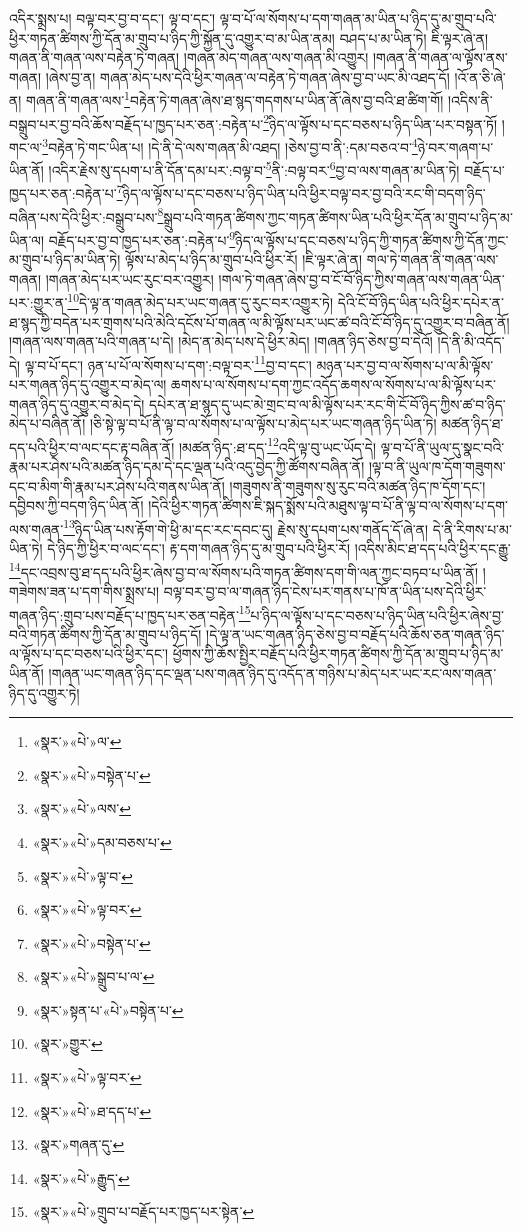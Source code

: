 འདིར་སྨྲས་པ། བལྟ་བར་བྱ་བ་དང་། ལྟ་བ་དང་། ལྟ་བ་པོ་ལ་སོགས་པ་དག་གཞན་མ་ཡིན་པ་ཉིད་དུ་མ་གྲུབ་པའི་ཕྱིར་གཏན་ཚིགས་ཀྱི་དོན་མ་གྲུབ་པ་ཉིད་ཀྱི་སྐྱོན་དུ་འགྱུར་བ་མ་ཡིན་ནམ། བཤད་པ་མ་ཡིན་ཏེ། ཇི་ལྟར་ཞེ་ན། གཞན་ནི་གཞན་ལས་བརྟེན་ཏེ་གཞན། །གཞན་མེད་གཞན་ལས་གཞན་མི་འགྱུར། །གཞན་ནི་གཞན་ལ་ལྟོས་ནས་གཞན། །ཞེས་བྱ་ན། གཞན་མེད་པས་དེའི་ཕྱིར་གཞན་ལ་བརྟེན་ཏེ་གཞན་ཞེས་བྱ་བ་ཡང་མི་འཐད་དོ། །འོ་ན་ཅི་ཞེ་ན། གཞན་ནི་གཞན་ལས་\footnote{«སྣར་»«པེ་»ལ་}བརྟེན་ཏེ་གཞན་ཞེས་ཐ་སྙད་གདགས་པ་ཡིན་ནོ་ཞེས་བྱ་བའི་ཐ་ཚིག་གོ། །འདིས་ནི་བསྒྲུབ་པར་བྱ་བའི་ཆོས་བརྗོད་པ་ཁྱད་པར་ཅན་:བརྟེན་པ་\footnote{«སྣར་»«པེ་»བསྟེན་པ་}ཉིད་ལ་ལྟོས་པ་དང་བཅས་པ་ཉིད་ཡིན་པར་བསྟན་ཏོ། །གང་ལ་\footnote{«སྣར་»«པེ་»ལས་}བརྟེན་ཏེ་གང་ཡིན་པ། །དེ་ནི་དེ་ལས་གཞན་མི་འཐད། །ཅེས་བྱ་བ་ནི་:དམ་བཅའ་བ་\footnote{«སྣར་»«པེ་»དམ་བཅས་པ་}ཉེ་བར་གཞག་པ་ཡིན་ནོ། །འདིར་རྗེས་སུ་དཔག་པ་ནི་དོན་དམ་པར་:བལྟ་བ་\footnote{«སྣར་»«པེ་»ལྟ་བ་}ནི་:བལྟ་བར་\footnote{«སྣར་»«པེ་»ལྟ་བར་}བྱ་བ་ལས་གཞན་མ་ཡིན་ཏེ། བརྗོད་པ་ཁྱད་པར་ཅན་:བརྟེན་པ་\footnote{«སྣར་»«པེ་»བསྟེན་པ་}ཉིད་ལ་ལྟོས་པ་དང་བཅས་པ་ཉིད་ཡིན་པའི་ཕྱིར་བལྟ་བར་བྱ་བའི་རང་གི་བདག་ཉིད་བཞིན་པས་དེའི་ཕྱིར་:བསྒྲུབ་པས་\footnote{«སྣར་»«པེ་»སྒྲུབ་པ་ལ་}སྒྲུབ་པའི་གཏན་ཚིགས་ཀྱང་གཏན་ཚིགས་ཡིན་པའི་ཕྱིར་དོན་མ་གྲུབ་པ་ཉིད་མ་ཡིན་ལ། བརྗོད་པར་བྱ་བ་ཁྱད་པར་ཅན་:བརྟེན་པ་\footnote{«སྣར་»སྟན་པ་«པེ་»བསྟེན་པ་}ཉིད་ལ་ལྟོས་པ་དང་བཅས་པ་ཉིད་ཀྱི་གཏན་ཚིགས་ཀྱི་དོན་ཀྱང་མ་གྲུབ་པ་ཉིད་མ་ཡིན་ཏེ། ལྟོས་པ་མེད་པ་ཉིད་མ་གྲུབ་པའི་ཕྱིར་རོ། །ཇི་ལྟར་ཞེ་ན། གལ་ཏེ་གཞན་ནི་གཞན་ལས་གཞན། །གཞན་མེད་པར་ཡང་རུང་བར་འགྱུར། །གལ་ཏེ་གཞན་ཞེས་བྱ་བ་ངོ་བོ་ཉིད་ཀྱིས་གཞན་ལས་གཞན་ཡིན་པར་:གྱུར་ན་\footnote{«སྣར་»གྱུར་}དེ་ལྟ་ན་གཞན་མེད་པར་ཡང་གཞན་དུ་རུང་བར་འགྱུར་ཏེ། དེའི་ངོ་བོ་ཉིད་ཡིན་པའི་ཕྱིར་དཔེར་ན་ཐ་སྙད་ཀྱི་བདེན་པར་གྲགས་པའི་མེའི་དངོས་པོ་གཞན་ལ་མི་ལྟོས་པར་ཡང་ཚ་བའི་ངོ་བོ་ཉིད་དུ་འགྱུར་བ་བཞིན་ནོ། །གཞན་ལས་གཞན་པའི་གཞན་པ་དེ། །མེད་ན་མེད་པས་དེ་ཕྱིར་མེད། །གཞན་ཉིད་ཅེས་བྱ་བ་དེའོ། །དེ་ནི་མི་འདོད་དེ། ལྟ་བ་པོ་དང་། ཉན་པ་པོ་ལ་སོགས་པ་དག་:བལྟ་བར་\footnote{«སྣར་»«པེ་»ལྟ་བར་}བྱ་བ་དང་། མཉན་པར་བྱ་བ་ལ་སོགས་པ་ལ་མི་ལྟོས་པར་གཞན་ཉིད་དུ་འགྱུར་བ་མེད་ལ། ཆགས་པ་ལ་སོགས་པ་དག་ཀྱང་འདོད་ཆགས་ལ་སོགས་པ་ལ་མི་ལྟོས་པར་གཞན་ཉིད་དུ་འགྱུར་བ་མེད་དེ། དཔེར་ན་ཐ་སྙད་དུ་ཡང་མེ་གྲང་བ་ལ་མི་ལྟོས་པར་རང་གི་ངོ་བོ་ཉིད་ཀྱིས་ཚ་བ་ཉིད་མེད་པ་བཞིན་ནོ། །ཅི་སྟེ་ལྟ་བ་པོ་ནི་ལྟ་བ་ལ་སོགས་པ་ལ་ལྟོས་པ་མེད་པར་ཡང་གཞན་ཉིད་ཡིན་ཏེ། མཚན་ཉིད་ཐ་དད་པའི་ཕྱིར་བ་ལང་དང་རྟ་བཞིན་ནོ། །མཚན་ཉིད་:ཐ་དད་\footnote{«སྣར་»«པེ་»ཐ་དད་པ་}འདི་ལྟ་བུ་ཡང་ཡོད་དེ། ལྟ་བ་པོ་ནི་ཡུལ་དུ་སྣང་བའི་རྣམ་པར་ཤེས་པའི་མཚན་ཉིད་དམ་དེ་དང་ལྡན་པའི་འདུ་བྱེད་ཀྱི་ཚོགས་བཞིན་ནོ། །ལྟ་བ་ནི་ཡུལ་ཁ་དོག་གཟུགས་དང་བ་མིག་གི་རྣམ་པར་ཤེས་པའི་གནས་ཡིན་ནོ། །གཟུགས་ནི་གཟུགས་སུ་རུང་བའི་མཚན་ཉིད་ཁ་དོག་དང་། དབྱིབས་ཀྱི་བདག་ཉིད་ཡིན་ནོ། །དེའི་ཕྱིར་གཏན་ཚིགས་ཇི་སྐད་སྨོས་པའི་མཐུས་ལྟ་བ་པོ་ནི་ལྟ་བ་ལ་སོགས་པ་དག་ལས་གཞན་\footnote{«སྣར་»གཞན་དུ་}ཉིད་ཡིན་པས་རྟོག་གེ་ཕྱི་མ་དང་རང་དབང་དུ། རྗེས་སུ་དཔག་པས་གནོད་དོ་ཞེ་ན། དེ་ནི་རིགས་པ་མ་ཡིན་ཏེ། དེ་ཉིད་ཀྱི་ཕྱིར་བ་ལང་དང་། རྟ་དག་གཞན་ཉིད་དུ་མ་གྲུབ་པའི་ཕྱིར་རོ། །འདིས་མིང་ཐ་དད་པའི་ཕྱིར་དང་རྒྱུ་\footnote{«སྣར་»«པེ་»རྒྱུད་}དང་འབྲས་བུ་ཐ་དད་པའི་ཕྱིར་ཞེས་བྱ་བ་ལ་སོགས་པའི་གཏན་ཚིགས་དག་གི་ལན་ཀྱང་བཏབ་པ་ཡིན་ནོ། །གཟེགས་ཟན་པ་དག་གིས་སྨྲས་པ། བལྟ་བར་བྱ་བ་ལ་གཞན་ཉིད་ངེས་པར་གནས་པ་ཁོ་ན་ཡིན་པས་དེའི་ཕྱིར་གཞན་ཉིད་:གྲུབ་པས་བརྗོད་པ་ཁྱད་པར་ཅན་བརྟེན་\footnote{«སྣར་»«པེ་»གྲུབ་པ་བརྗོད་པར་ཁྱད་པར་སྟེན་}པ་ཉིད་ལ་ལྟོས་པ་དང་བཅས་པ་ཉིད་ཡིན་པའི་ཕྱིར་ཞེས་བྱ་བའི་གཏན་ཚིགས་ཀྱི་དོན་མ་གྲུབ་པ་ཉིད་དོ། །དེ་ལྟ་ན་ཡང་གཞན་ཉིད་ཅེས་བྱ་བ་བརྗོད་པའི་ཆོས་ཅན་གཞན་ཉིད་ལ་ལྟོས་པ་དང་བཅས་པའི་ཕྱིར་དང་། ཕྱོགས་ཀྱི་ཆོས་སྤྱིར་བརྗོད་པའི་ཕྱིར་གཏན་ཚིགས་ཀྱི་དོན་མ་གྲུབ་པ་ཉིད་མ་ཡིན་ནོ། །གཞན་ཡང་གཞན་ཉིད་དང་ལྡན་པས་གཞན་ཉིད་དུ་འདོད་ན་གཉིས་པ་མེད་པར་ཡང་རང་ལས་གཞན་ཉིད་དུ་འགྱུར་ཏེ། 